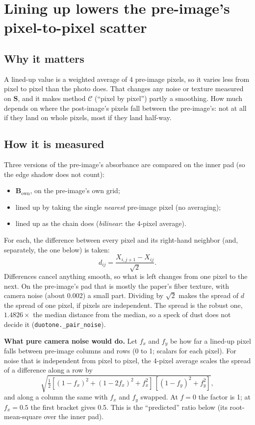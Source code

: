 \documentclass[11pt,letterpaper]{article}
\newcommand{\code}[1]{\texttt{#1}}
\newcommand{\mS}{\mathbf{S}}   %
\newcommand{\Bown}{\mathbf{B}_{\text{own}}}
\newcommand{\MC}{\mathcal{C}}
\begin{document}
\section{Lining up lowers the pre-image's pixel-to-pixel scatter}
\label{sec:lineup}

\subsection{Why it matters}

A lined-up value is a weighted average of 4 pre-image pixels, so it varies
less from pixel to pixel than the photo does.  That changes any noise or
texture measured on $\mS$, and it makes method $\MC$ (``pixel by pixel'')
partly a smoothing.  How much depends on where the post-image's pixels
fall between the pre-image's: not at all if they land on whole pixels, most
if they land half-way.

\subsection{How it is measured}

Three versions of the pre-image's absorbance are compared on the inner pad
(so the edge shadow does not count):
\begin{itemize}[nosep]
  \item $\Bown$, on the pre-image's own grid;
  \item lined up by taking the single \emph{nearest} pre-image pixel (no
    averaging);
  \item lined up as the chain does (\emph{bilinear}: the 4-pixel average).
\end{itemize}
For each, the difference between every pixel and its right-hand neighbor
(and, separately, the one below) is taken:
\begin{equation}
  d_{ij} = \frac{X_{i,j+1} - X_{ij}}{\sqrt 2}.
\end{equation}
Differences cancel anything smooth, so what is left changes from one pixel
to the next.  On the pre-image's pad that is mostly the paper's fiber
texture, with camera noise (about 0.002) a small part.  Dividing by
$\sqrt 2$ makes the spread of $d$ the spread of one pixel, if pixels are
independent.  The spread is the robust one, $1.4826 \times$ the median
distance from the median, so a speck of dust does not decide it
(\code{duotone.\_pair\_noise}).

\noindent\textbf{What pure camera noise would do.}  Let $f_x$ and $f_y$ be
how far a lined-up pixel falls between pre-image columns and rows (0 to 1;
scalars for each pixel).  For noise that is independent from pixel to
pixel, the 4-pixel average scales the spread of a difference along a row by
\begin{equation}
  \sqrt{\tfrac12\left[(1-f_x)^2 + (1-2f_x)^2 + f_x^2\right]\,
        \left[(1-f_y)^2 + f_y^2\right]},
\end{equation}
and along a column the same with $f_x$ and $f_y$ swapped.  At $f = 0$ the
factor is 1; at $f_x = 0.5$ the first bracket gives 0.5.  This is the
``predicted'' ratio below (its root-mean-square over the inner pad).
\end{document}
